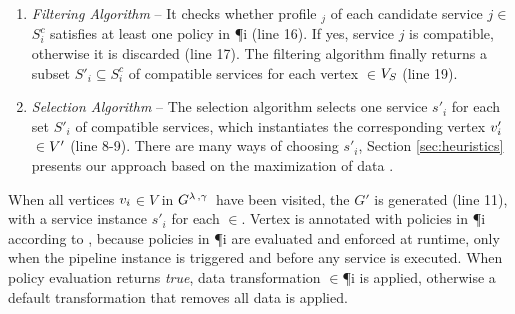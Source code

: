 \begin{enumerate}
  \item \textit{Filtering Algorithm} -- It checks whether profile \profile$_j$ of each candidate service $\si{j}$$\in$$S^c_{i}$ satisfies at least one policy in \P{i} {\color{OurColor}(line 16)}. If yes, service $\si{j}$ is compatible, otherwise it is discarded {\color{OurColor}(line 17)}. The filtering algorithm finally returns a subset $S'_{i}$$\subseteq$$S^c_{i}$ of compatible services for each vertex $\in$$V_S$ {\color{OurColor}(line 19)}.
  \item \textit{Selection Algorithm} -- The selection algorithm selects one service $s'_i$ for each set $S'_{i}$ of compatible services, which instantiates the corresponding vertex $v'_{i}$$\in$$V'$ {\color{OurColor}(line 8-9)}. There are many ways of choosing $s'_i$, Section \ref{sec:heuristics} presents our approach based on the maximization of data \quality \emph{\q}.
\end{enumerate}

When all vertices $v_{i}$$\in$$V$ in $G^{\lambda\,,\gamma\,}$ have been visited, the \pipelineInstance $G'$ is generated {\color{OurColor}(line 11)}, with a service instance $s'_i$ for each $\in$\Vp. Vertex  is annotated with policies in \P{i} according to \myLambda, because policies in \P{i} are evaluated and enforced at runtime, only when the pipeline instance is triggered and before any service is executed. When policy evaluation returns \emph{true}, data transformation \TP$\in$\P{i} is applied, otherwise a default transformation that removes all data is applied.